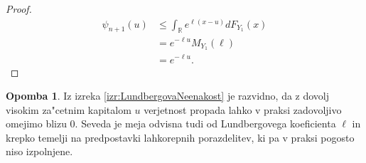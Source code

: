 \documentclass[12pt, a4paper, reqno]{amsart}
\theoremstyle{definition}
\newtheorem{opomba}[definicija]{Opomba}
\theoremstyle{plain}
\newcommand{\R}{\mathbb{R}}
\newcommand{\1}{\mathds{1}}
\begin{document}
\begin{proof}
                \begin{align*}
                    \psi_{n+1}(u) &\leq \int_{\R}e^{\ell (x - u)}dF_{Y_1}(x) \\
                                  &= e^{-\ell u}M_{Y_1}(\ell) \\
                                  &= e^{-\ell u}.
                \end{align*}

            \end{proof}

            \begin{opomba}
                Iz izreka \ref{izr:LundbergovaNeenakost} je razvidno, da z dovolj visokim za"cetnim kapitalom
                $u$ verjetnost propada lahko v praksi zadovoljivo omejimo blizu $0$. Seveda je meja 
                odvisna tudi od Lundbergovega koeficienta $\ell$ in krepko temelji na predpostavki 
                lahkorepnih porazdelitev, ki pa v praksi pogosto niso izpolnjene.
                \label{op:LundbergovaNeenakost}
            \end{opomba}
\end{document}
